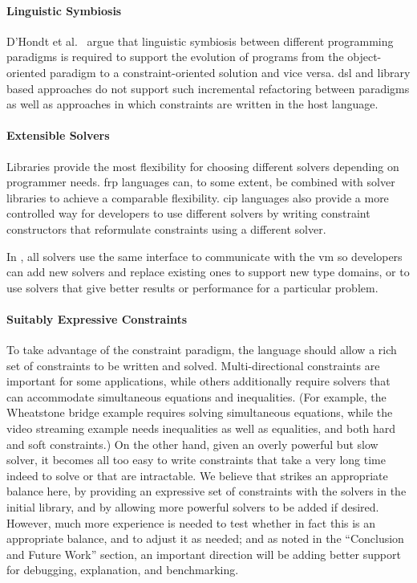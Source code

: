 \paragraph{Linguistic Symbiosis}
D'Hondt et al.~\cite{d2004seamless} argue that linguistic symbiosis
between different programming paradigms is required to support the
evolution of programs from the object-oriented paradigm to a
constraint-oriented solution and vice versa. \ac{dsl} and library
based approaches do not support such incremental refactoring between
paradigms as well as approaches in which constraints are written in the
host language.

\paragraph{Extensible Solvers}
Libraries provide the most flexibility for choosing different solvers
depending on programmer needs. \ac{frp} languages can, to some extent,
be combined with solver libraries to achieve a comparable
flexibility. \ac{cip} languages also provide a more controlled way for
developers to use different solvers by writing constraint constructors
that reformulate constraints using a different solver.

In \langname, all solvers use the same interface to communicate with
the \ac{vm} so developers can add new solvers and replace existing
ones to support new type domains, or to use solvers that give better
results or performance for a particular problem.

\paragraph{Suitably Expressive Constraints}
To take advantage of the constraint paradigm, the language should
allow a rich set of constraints to be written and solved.
Multi-directional constraints are important for some applications,
while others additionally require solvers that can accommodate
simultaneous equations and inequalities.  (For example, the Wheatstone
bridge example requires solving simultaneous equations, while the
video streaming example needs inequalities as well as equalities, and
both hard and soft constraints.)  On the other hand, given an overly
powerful but slow solver, it becomes all too easy to write constraints that
take a very long time indeed to solve or that are intractable.  We
believe that \langname strikes an appropriate balance here, by
providing an expressive set of constraints with the solvers in the
initial library, and by allowing more powerful solvers to be added if
desired.  However, much more experience is needed to test whether in
fact this is an appropriate balance, and to adjust it as needed; and
as noted in the ``Conclusion and Future Work'' section, an important
direction will be adding better support for debugging, explanation,
and benchmarking.

